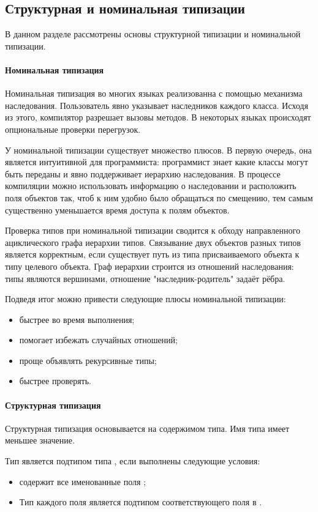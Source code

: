 \subsection{Структурная и номинальная типизации}
В данном разделе рассмотрены основы структурной типизации и номинальной типизации.

\paragraph{Номинальная типизация}
Номинальная типизация во многих языках реализованна с помощью механизма наследования\cite{book:pierce}. Пользователь явно указывает наследников каждого класса. Исходя из этого, компилятор разрешает вызовы методов. В некоторых языках происходят опциональные проверки перегрузок.

У номинальной типизации существует множество плюсов. В первую очередь, она является интуитивной для программиста: программист знает какие классы могут быть переданы и явно поддерживает иерархию наследования. В процессе компиляции можно использовать информацию о наследовании и расположить поля объектов так, чтоб к ним удобно было обращаться по смещению, тем самым существенно уменьшается время доступа к полям объектов.

Проверка типов при номинальной типизации сводится к обходу направленного ациклического графа иерархии типов. Связывание двух объектов разных типов является корректным, если существует путь из типа присваиваемого объекта к типу целевого объекта. Граф иерархии строится из отношений наследования: типы являются вершинами, отношение "наследник-родитель" задаёт рёбра.

Подведя итог можно привести следующие плюсы номинальной типизации:
\begin{itemize}
    \item быстрее во время выполнения;
    \item помогает избежать случайных отношений;
    \item проще объявлять рекурсивные типы;
    \item быстрее проверять.
\end{itemize}

\paragraph{Структурная типизация}
Структурная типизация основывается на содержимом типа\cite{book:pierce}. Имя типа имеет меньшее значение.

Тип  является подтипом типа , если выполнены следующие условия:
\begin{itemize}
    \item {} содержит все именованные поля ;
    \item Тип каждого поля  является подтипом соответствующего поля в .
\end{itemize}

